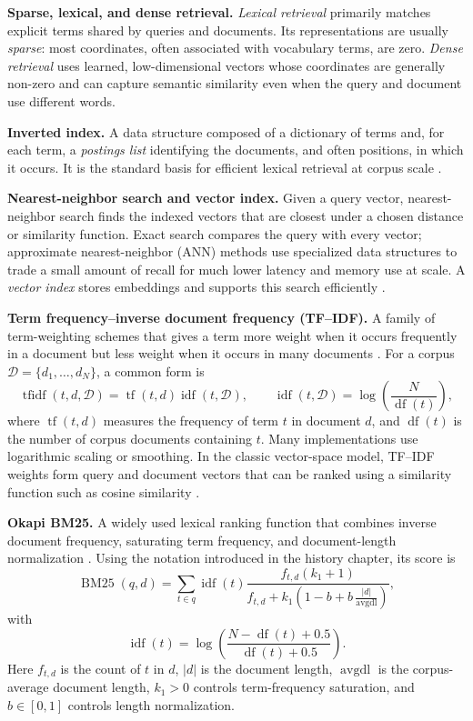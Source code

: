 \noindent\textbf{Sparse, lexical, and dense retrieval.}
\emph{Lexical retrieval} primarily matches explicit terms shared by queries and
documents. Its representations are usually \emph{sparse}: most coordinates,
often associated with vocabulary terms, are zero. \emph{Dense retrieval} uses
learned, low-dimensional vectors whose coordinates are generally non-zero and
can capture semantic similarity even when the query and document use different
words.

\noindent\textbf{Inverted index.}
A data structure composed of a dictionary of terms and, for each term, a
\emph{postings list} identifying the documents, and often positions, in which it
occurs. It is the standard basis for efficient lexical retrieval at corpus scale
.

\noindent\textbf{Nearest-neighbor search and vector index.}
Given a query vector, nearest-neighbor search finds the indexed vectors that are
closest under a chosen distance or similarity function. Exact search compares
the query with every vector; approximate nearest-neighbor (ANN) methods use
specialized data structures to trade a small amount of recall for much lower
latency and memory use at scale. A \emph{vector index} stores embeddings and
supports this search efficiently .

\noindent\textbf{Term frequency--inverse document frequency (TF--IDF).}
A family of term-weighting schemes that gives a term more weight when it occurs
frequently in a document but less weight when it occurs in many documents
. For a corpus
$\mathcal{D}=\{d_1,\ldots,d_N\}$, a common form is
\[
  \operatorname{tfidf}(t,d,\mathcal{D})
  =
  \operatorname{tf}(t,d)\operatorname{idf}(t,\mathcal{D}),
  \qquad
  \operatorname{idf}(t,\mathcal{D})
  =
  \log\!\left(\frac{N}{\operatorname{df}(t)}\right),
\]
where $\operatorname{tf}(t,d)$ measures the frequency of term $t$ in document
$d$, and $\operatorname{df}(t)$ is the number of corpus documents containing
$t$. Many implementations use logarithmic scaling or smoothing. In the classic
vector-space model, TF--IDF weights form query and document vectors that can be
ranked using a similarity function such as cosine similarity
.

\noindent\textbf{Okapi BM25.}
A widely used lexical ranking function that combines inverse document
frequency, saturating term frequency, and document-length normalization
. Using the notation introduced
in the history chapter, its score is
\[
  \operatorname{BM25}(q,d)
  =
  \sum_{t\in q}
  \operatorname{idf}(t)
  \frac{f_{t,d}(k_1+1)}
       {f_{t,d}+k_1\!\left(1-b+b\,\frac{|d|}{\operatorname{avgdl}}\right)},
\]
with
\[
  \operatorname{idf}(t)
  =
  \log\!\left(
  \frac{N-\operatorname{df}(t)+0.5}
       {\operatorname{df}(t)+0.5}
  \right).
\]
Here $f_{t,d}$ is the count of $t$ in $d$, $|d|$ is the document length,
$\operatorname{avgdl}$ is the corpus-average document length, $k_1>0$ controls
term-frequency saturation, and $b\in[0,1]$ controls length normalization.

